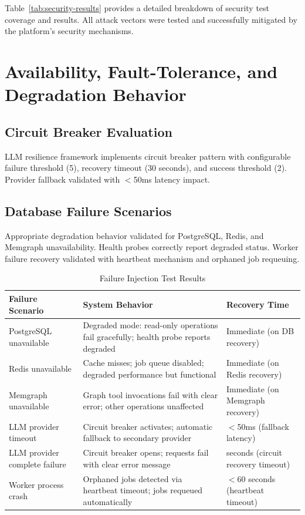 \documentclass[a4paper,twoside]{sapthesis}
\begin{document}
Table~\ref{tab:security-results} provides a detailed breakdown of security test coverage and results. All attack vectors were tested and successfully mitigated by the platform's security mechanisms.

\section{Availability, Fault-Tolerance, and Degradation Behavior}
\label{sec:availability-ft}

\subsection{Circuit Breaker Evaluation}

LLM resilience framework implements circuit breaker pattern with configurable failure threshold (5), recovery timeout (30 seconds), and success threshold (2). Provider fallback validated with $<$50ms latency impact.

\subsection{Database Failure Scenarios}

Appropriate degradation behavior validated for PostgreSQL, Redis, and Memgraph unavailability. Health probes correctly report degraded status. Worker failure recovery validated with heartbeat mechanism and orphaned job requeuing.

\begin{table}[ht]
\centering
\caption{Failure Injection Test Results}
\label{tab:failure-injection}
\small
\begin{tabularx}{\textwidth}{|>{\raggedright\arraybackslash}p{2.2cm}|>{\raggedright\arraybackslash}X|>{\raggedright\arraybackslash}p{2.5cm}|}
    \hline
    \textbf{Failure Scenario} & \textbf{System Behavior} & \textbf{Recovery Time} \\
    \hline
    PostgreSQL unavailable & Degraded mode: read-only operations fail gracefully; health probe reports degraded & Immediate (on DB recovery) \\
    \hline
    Redis unavailable & Cache misses; job queue disabled; degraded performance but functional & Immediate (on Redis recovery) \\
    \hline
    Memgraph unavailable & Graph tool invocations fail with clear error; other operations unaffected & Immediate (on Memgraph recovery) \\
    \hline
    LLM provider timeout & Circuit breaker activates; automatic fallback to secondary provider & $<$50ms (fallback latency) \\
    \hline
    LLM provider complete failure & Circuit breaker opens; requests fail with clear error message & 30 seconds (circuit recovery timeout) \\
    \hline
    Worker process crash & Orphaned jobs detected via heartbeat timeout; jobs requeued automatically & $<$60 seconds (heartbeat timeout) \\
    \hline
\end{tabularx}
\end{table}
\end{document}
